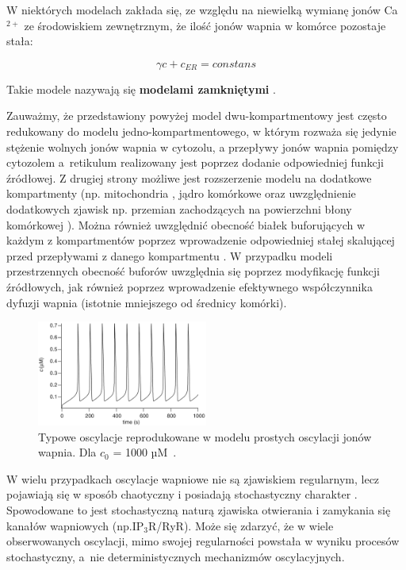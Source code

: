 W niektórych modelach zakłada się, ze względu na niewielką wymianę jonów Ca$^{2+}$ ze środowiskiem zewnętrznym, że ilość jonów wapnia w komórce pozostaje stała:

\begin{equation}
\gamma c + c_{ER} = constans
\end{equation}

\noindent Takie modele nazywają się \textbf{modelami zamkniętymi} \cite{Keener2009}.

Zauważmy, że przedstawiony powyżej model dwu-kompartmentowy jest często redukowany do modelu jedno-kompartmentowego, w którym rozważa się jedynie stężenie wolnych jonów wapnia w cytozolu, a przepływy jonów wapnia pomiędzy cytozolem a~retikulum realizowany jest poprzez dodanie odpowiedniej funkcji źródłowej. Z drugiej strony możliwe jest rozszerzenie modelu na dodatkowe kompartmenty (np. mitochondria \cite{Marhl2000}, jądro komórkowe \cite{Alonso2006} oraz uwzględnienie dodatkowych zjawisk np. przemian zachodzących na powierzchni błony komórkowej \cite{Hernjak2005}). Można również uwzględnić obecność białek buforujących w każdym z kompartmentów poprzez wprowadzenie odpowiedniej stałej skalującej przed przepływami z danego kompartmentu \cite{Marhl2000}. W przypadku modeli przestrzennych obecność buforów uwzględnia się poprzez  modyfikację funkcji źródłowych, jak również poprzez wprowadzenie efektywnego współczynnika dyfuzji wapnia (istotnie mniejszego od średnicy komórki).

\begin{figure}
\includegraphics[width=0.5\textwidth]{rysunki/rozdzial_2/sneydoscilations.png}
\caption[Oscylacje wapniowe w modelu Sneyda]{Typowe oscylacje reprodukowane w modelu prostych oscylacji jonów wapnia. Dla $c_0$ = 1000 µM~\cite{Keener2009}.}
\label{fig:sneydoscylacje}
\end{figure}

W wielu przypadkach oscylacje wapniowe nie są zjawiskiem regularnym, lecz pojawiają się w sposób chaotyczny i posiadają stochastyczny charakter \cite{Falcke2004}. Spowodowane to jest stochastyczną naturą zjawiska otwierania i zamykania się kanałów wapniowych (np.IP$_3$R/RyR). Może się zdarzyć, że w wiele obserwowanych oscylacji, mimo swojej regularności powstała w wyniku procesów  stochastyczny, a~nie deterministycznych mechanizmów oscylacyjnych.

